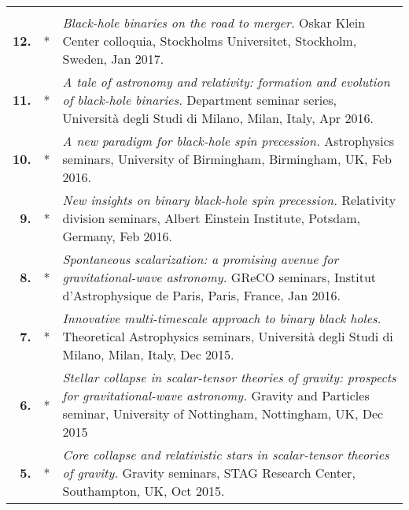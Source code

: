\documentclass[a4paper]{moderncv}
\begin{document}
{\begin{longtable}{rp{0.4cm}p{15.8cm}}
\vspace{0.05cm}\\
%
\textbf{12.} & *& \textit{Black-hole binaries on the road to merger.}
\newline{} 
Oskar Klein Center colloquia, Stockholms Universitet, Stockholm, Sweden, Jan 2017.
\vspace{0.05cm}\\
%
\textbf{11.} & *& \textit{A tale of astronomy and relativity: formation and evolution of black-hole binaries.}
\newline{} 
Department seminar series, Università degli Studi di Milano, Milan, Italy, Apr 2016.
\vspace{0.05cm}\\
%
\textbf{10.} & *& \textit{A new paradigm for black-hole spin precession.}
\newline{} 
Astrophysics seminars, University of Birmingham, Birmingham, UK, Feb 2016.
\vspace{0.05cm}\\
%
\textbf{9.} & *& \textit{New insights on binary black-hole spin precession.}
\newline{} 
Relativity division seminars, Albert Einstein Institute, Potsdam, Germany, Feb 2016.
\vspace{0.05cm}\\
%
\textbf{8.} & *& \textit{Spontaneous scalarization: a promising avenue for gravitational-wave astronomy.}
\newline{} 
GReCO seminars, Institut d'Astrophysique de Paris, Paris, France, Jan 2016.
\vspace{0.05cm}\\
%
\textbf{7.} & *& \textit{Innovative multi-timescale approach to binary black holes.}
\newline{} 
Theoretical Astrophysics seminars, Università degli Studi di Milano, Milan, Italy, Dec 2015.
\vspace{0.05cm}\\
%
\textbf{6.} & *& \textit{Stellar collapse in scalar-tensor theories of gravity: prospects for gravitational-wave astronomy.}
\newline{} 
Gravity and Particles seminar, University of Nottingham, Nottingham, UK, Dec 2015
\vspace{0.05cm}\\
%
\textbf{5.} & *& \textit{Core collapse and relativistic stars in scalar-tensor theories of gravity.}
\newline{} 
Gravity seminars, STAG Research Center, Southampton, UK, Oct 2015.

\end{longtable}}
\end{document}
